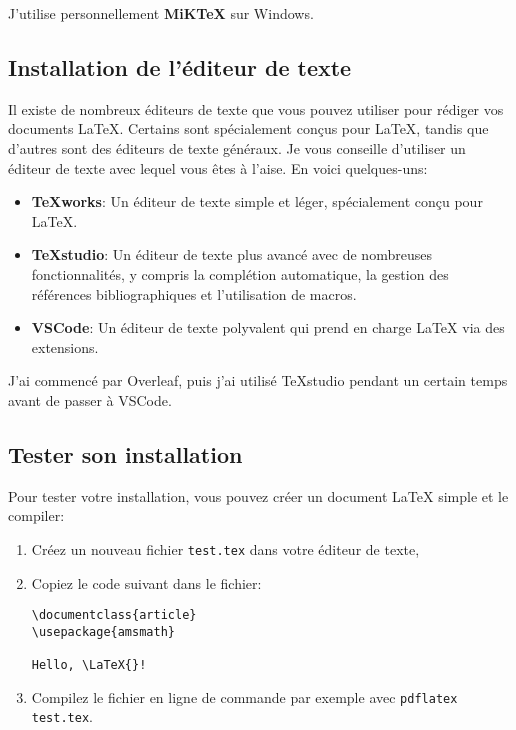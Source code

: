 J'utilise personnellement \textbf{MiKTeX} sur Windows.

\subsection{Installation de l'éditeur de texte}\label{subsec:editor_installation}

Il existe de nombreux éditeurs de texte que vous pouvez utiliser pour rédiger vos documents LaTeX.
Certains sont spécialement conçus pour LaTeX, tandis que d'autres sont des éditeurs de texte généraux.
Je vous conseille d'utiliser un éditeur de texte avec lequel vous êtes à l'aise. En voici quelques-uns:

\begin{itemize}
    \item \textbf{TeXworks}: Un éditeur de texte simple et léger, spécialement conçu pour LaTeX.
    \item \textbf{TeXstudio}: Un éditeur de texte plus avancé avec de nombreuses fonctionnalités, 
    y compris la complétion automatique, la gestion des références bibliographiques et l'utilisation de macros.
    \item \textbf{VSCode}: Un éditeur de texte polyvalent qui prend en charge LaTeX via des extensions.
\end{itemize}

J'ai commencé par Overleaf, puis j'ai utilisé TeXstudio pendant un certain temps avant de passer à VSCode.

\subsection{Tester son installation}\label{subsec:test_installation}

Pour tester votre installation, vous pouvez créer un document LaTeX simple et le compiler:

\begin{enumerate}
    \item Créez un nouveau fichier \texttt{test.tex} dans votre éditeur de texte,
    \item Copiez le code suivant dans le fichier: %
\begin{lstlisting}[style=latexstyle]
\documentclass{article}
\usepackage{amsmath}

Hello, \LaTeX{}!

\end{lstlisting}
    \item Compilez le fichier en ligne de commande par exemple avec \texttt{pdflatex test.tex}.
\end{enumerate}

